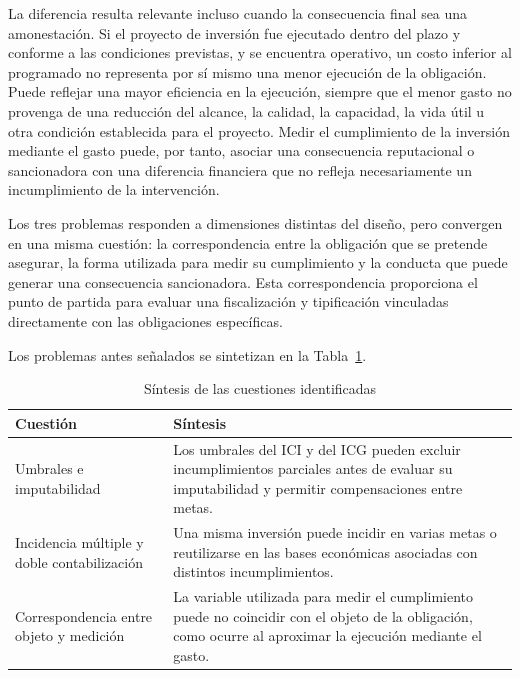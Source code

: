 La diferencia resulta relevante incluso cuando la consecuencia final sea una amonestación. Si el proyecto de inversión fue ejecutado dentro del plazo y conforme a las condiciones previstas, y se encuentra operativo, un costo inferior al programado no representa por sí mismo una menor ejecución de la obligación. Puede reflejar una mayor eficiencia en la ejecución, siempre que el menor gasto no provenga de una reducción del alcance, la calidad, la capacidad, la vida útil u otra condición establecida para el proyecto. Medir el cumplimiento de la inversión mediante el gasto puede, por tanto, asociar una consecuencia reputacional o sancionadora con una diferencia financiera que no refleja necesariamente un incumplimiento de la intervención.

Los tres problemas responden a dimensiones distintas del diseño, pero convergen en una misma cuestión: la correspondencia entre la obligación que se pretende asegurar, la forma utilizada para medir su cumplimiento y la conducta que puede generar una consecuencia sancionadora. Esta correspondencia proporciona el punto de partida para evaluar una fiscalización y tipificación vinculadas directamente con las obligaciones específicas.

Los problemas antes señalados se sintetizan en la Tabla~\ref{tab:cuestiones_ici_icg}.

\begin{table}[t]
\centering
\caption{Síntesis de las cuestiones identificadas}
\label{tab:cuestiones_ici_icg}
\small
\renewcommand{\arraystretch}{1.15}
\begin{tabularx}{\columnwidth}{
>{\raggedright\arraybackslash}p{}
>{\raggedright\arraybackslash}X}
\hline
\textbf{Cuestión} & \textbf{Síntesis} \\
\hline
Umbrales e imputabilidad &
Los umbrales del ICI y del ICG pueden excluir incumplimientos parciales antes de evaluar su imputabilidad y permitir compensaciones entre metas. \\
\hline
Incidencia múltiple y doble contabilización &
Una misma inversión puede incidir en varias metas o reutilizarse en las bases económicas asociadas con distintos incumplimientos. \\
\hline
Correspondencia entre objeto y medición &
La variable utilizada para medir el cumplimiento puede no coincidir con el objeto de la obligación, como ocurre al aproximar la ejecución mediante el gasto. \\
\hline
\end{tabularx}
\end{table}

